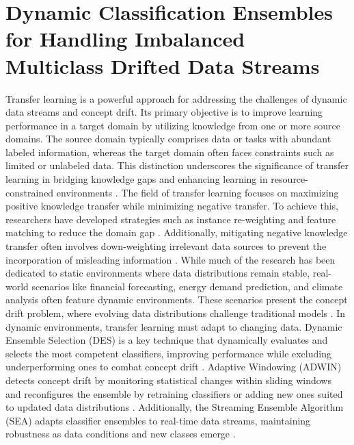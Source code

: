 \chapter{Dynamic Classification Ensembles for Handling Imbalanced
Multiclass Drifted Data Streams}
\label{chapter:6_transfer_learning}
Transfer learning is a powerful approach for addressing the challenges of dynamic data streams and concept drift. Its primary objective is to improve learning performance in a target domain by utilizing knowledge from one or more source domains. The source domain typically comprises data or tasks with abundant labeled information, whereas the target domain often faces constraints such as limited or unlabeled data. This distinction underscores the significance of transfer learning in bridging knowledge gaps and enhancing learning in resource-constrained environments \cite{pan2009survey, wang2019characterizing}.  
The field of transfer learning focuses on maximizing positive knowledge transfer while minimizing negative transfer. To achieve this, researchers have developed strategies such as instance re-weighting and feature matching to reduce the domain gap \cite{zadrozny2004learning, cortes2008sample, pan2010domain, sun2016return}. Additionally, mitigating negative knowledge transfer often involves down-weighting irrelevant data sources to prevent the incorporation of misleading information \cite{wang2019characterizing}. While much of the research has been dedicated to static environments where data distributions remain stable, real-world scenarios like financial forecasting, energy demand prediction, and climate analysis often feature dynamic environments. These scenarios present the concept drift problem, where evolving data distributions challenge traditional models \cite{li2015learning, cao2019learning}.  
In dynamic environments, transfer learning must adapt to changing data. Dynamic Ensemble Selection (DES) is a key technique that dynamically evaluates and selects the most competent classifiers, improving performance while excluding underperforming ones to combat concept drift \cite{cruz2017meta, jackowski2014improved, kuncheva2000clustering}. Adaptive Windowing (ADWIN) detects concept drift by monitoring statistical changes within sliding windows and reconfigures the ensemble by retraining classifiers or adding new ones suited to updated data distributions \cite{madkour2023historical}. Additionally, the Streaming Ensemble Algorithm (SEA) adapts classifier ensembles to real-time data streams, maintaining robustness as data conditions and new classes emerge \cite{gama2004learning, adams2023explainable, madkour2023historical}.
